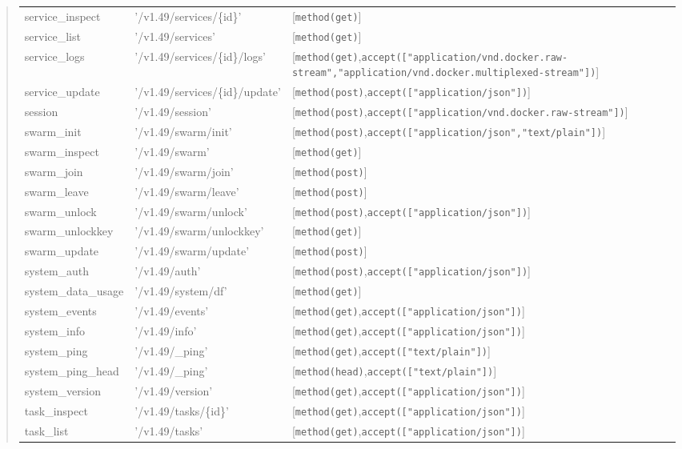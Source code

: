 \begin{description}
\begin{quote}
\begin{tabulary}{0.9\textwidth}{|l|L|L|}
service_inspect & '/v1.49/services/\{id\}' & [\verb$method(get)$] \\
service_list & '/v1.49/services' & [\verb$method(get)$] \\
service_logs & '/v1.49/services/\{id\}/logs' & [\verb$method(get)$,\verb$accept(["application/vnd.docker.raw-stream","application/vnd.docker.multiplexed-stream"])$] \\
service_update & '/v1.49/services/\{id\}/update' & [\verb$method(post)$,\verb$accept(["application/json"])$] \\
session & '/v1.49/session' & [\verb$method(post)$,\verb$accept(["application/vnd.docker.raw-stream"])$] \\
swarm_init & '/v1.49/swarm/init' & [\verb$method(post)$,\verb$accept(["application/json","text/plain"])$] \\
swarm_inspect & '/v1.49/swarm' & [\verb$method(get)$] \\
swarm_join & '/v1.49/swarm/join' & [\verb$method(post)$] \\
swarm_leave & '/v1.49/swarm/leave' & [\verb$method(post)$] \\
swarm_unlock & '/v1.49/swarm/unlock' & [\verb$method(post)$,\verb$accept(["application/json"])$] \\
swarm_unlockkey & '/v1.49/swarm/unlockkey' & [\verb$method(get)$] \\
swarm_update & '/v1.49/swarm/update' & [\verb$method(post)$] \\
system_auth & '/v1.49/auth' & [\verb$method(post)$,\verb$accept(["application/json"])$] \\
system_data_usage & '/v1.49/system/df' & [\verb$method(get)$] \\
system_events & '/v1.49/events' & [\verb$method(get)$,\verb$accept(["application/json"])$] \\
system_info & '/v1.49/info' & [\verb$method(get)$,\verb$accept(["application/json"])$] \\
system_ping & '/v1.49/_ping' & [\verb$method(get)$,\verb$accept(["text/plain"])$] \\
system_ping_head & '/v1.49/_ping' & [\verb$method(head)$,\verb$accept(["text/plain"])$] \\
system_version & '/v1.49/version' & [\verb$method(get)$,\verb$accept(["application/json"])$] \\
task_inspect & '/v1.49/tasks/\{id\}' & [\verb$method(get)$,\verb$accept(["application/json"])$] \\
task_list & '/v1.49/tasks' & [\verb$method(get)$,\verb$accept(["application/json"])$] \\

\end{tabulary}
\end{quote}
\end{description}
